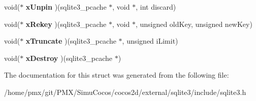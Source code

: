 \begin{DoxyCompactItemize}
void($\ast$ {\bfseries x\+Unpin} )(sqlite3\+\_\+pcache $\ast$, void $\ast$, int discard)
\item 
\mbox{\label{structsqlite3__pcache__methods_adc5552190f1de86eb95d91e9cf8430e6}} 
void($\ast$ {\bfseries x\+Rekey} )(sqlite3\+\_\+pcache $\ast$, void $\ast$, unsigned old\+Key, unsigned new\+Key)
\item 
\mbox{\label{structsqlite3__pcache__methods_aad73f9335999770bcd2dc6a2d914b4f0}} 
void($\ast$ {\bfseries x\+Truncate} )(sqlite3\+\_\+pcache $\ast$, unsigned i\+Limit)
\item 
\mbox{\label{structsqlite3__pcache__methods_aac18fc581d8d63550a6657016c24ba5d}} 
void($\ast$ {\bfseries x\+Destroy} )(sqlite3\+\_\+pcache $\ast$)
\end{DoxyCompactItemize}


The documentation for this struct was generated from the following file\+:\begin{DoxyCompactItemize}
\item 
/home/pmx/git/\+P\+M\+X/\+Simu\+Cocos/cocos2d/external/sqlite3/include/sqlite3.\+h\end{DoxyCompactItemize}
